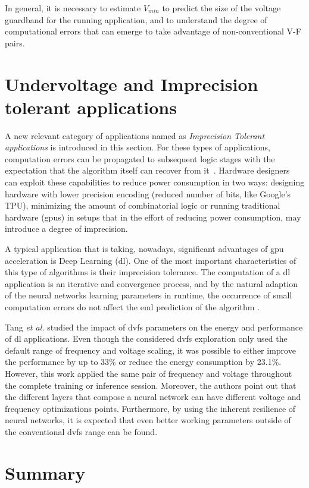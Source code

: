 In general, it is necessary to estimate $V_{min}$ to predict the size of the voltage guardband for the running application, and to understand the degree of computational errors that can emerge to take advantage of non-conventional V-F pairs.

\section{Undervoltage and Imprecision tolerant applications}
\label{sec:under_int_app}
A new relevant category of applications named as \textit{Imprecision Tolerant applications} is introduced in this section. For these types of applications, computation errors can be propagated to subsequent logic stages with the expectation that the algorithm itself can recover from it~\cite{nakhaee_lifetime_2018}. Hardware designers can exploit these capabilities to reduce power consumption in two ways: designing hardware with lower precision encoding (reduced number of bits, like Google's TPU), minimizing the amount of combinatorial logic or running traditional hardware (\acrshort{gpu}s) in setups that in the effort of reducing power consumption, may introduce a degree of imprecision.

A typical application that is taking, nowadays, significant advantages of \acrshort{gpu} acceleration is Deep Learning (\acrshort{dl}). One of the most important characteristics of this type of algorithms is their imprecision tolerance. The computation of a \acrshort{dl} application is an iterative and convergence process, and by the natural adaption of the neural networks learning parameters in runtime, the occurrence of small computation errors do not affect the end prediction of the algorithm \cite{jiao_assessment_2017}.

Tang \textit{et al.} \cite{tang_impact_2019} studied the impact of \acrshort{dvfs} parameters on the energy and performance of \acrshort{dl} applications. Even though the considered \acrshort{dvfs} exploration only used the default range of frequency and voltage scaling, it was possible to either improve the performance by up to 33\% or reduce the energy consumption by 23.1\%. However, this work applied the same pair of frequency and voltage throughout the complete training or inference session. Moreover, the authors point out that the different layers that compose a neural network can have different voltage and frequency optimizations points. Furthermore, by using the inherent resilience of neural networks, it is expected that even better working parameters outside of the conventional \acrshort{dvfs} range can be found. 

\section{Summary}